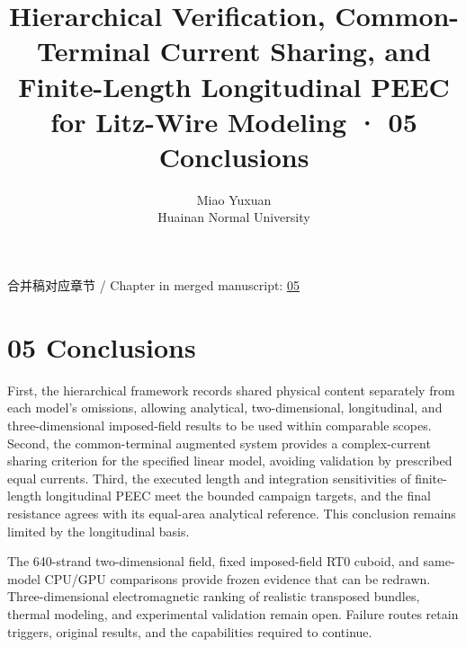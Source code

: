 \documentclass[11pt]{article}
\begin{document}
\title{Hierarchical Verification, Common-Terminal Current Sharing, and Finite-Length Longitudinal PEEC for Litz-Wire Modeling · 05 Conclusions}
\author{Miao Yuxuan\\Huainan Normal University}
\date{}
\maketitle
\noindent 合并稿对应章节 / Chapter in merged manuscript: \href{paper_en_single.pdf#chapter-05}{05}\par
\FloatBarrier
\section*{05 Conclusions}
\hypertarget{chapter-05}{}
First, the hierarchical framework records shared physical content separately from each model’s omissions, allowing analytical, two-dimensional, longitudinal, and three-dimensional imposed-field results to be used within comparable scopes. Second, the common-terminal augmented system provides a complex-current sharing criterion for the specified linear model, avoiding validation by prescribed equal currents. Third, the executed length and integration sensitivities of finite-length longitudinal PEEC meet the bounded campaign targets, and the final resistance agrees with its equal-area analytical reference. This conclusion remains limited by the longitudinal basis.


The 640-strand two-dimensional field, fixed imposed-field RT0 cuboid, and same-model CPU/GPU comparisons provide frozen evidence that can be redrawn. Three-dimensional electromagnetic ranking of realistic transposed bundles, thermal modeling, and experimental validation remain open. Failure routes retain triggers, original results, and the capabilities required to continue.
\end{document}
